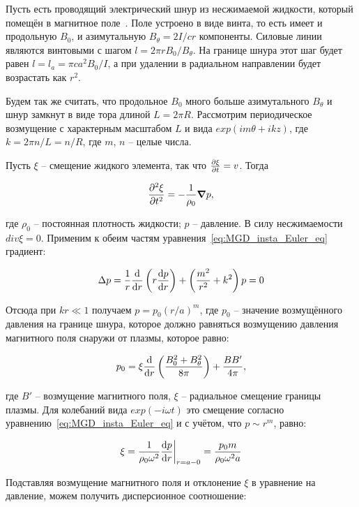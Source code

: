 \documentclass[10pt, a4paper]{article}
\begin{document}
Пусть есть проводящий электрический шнур из несжимаемой жидкости, который помещён в магнитное поле~\cite{kadomtsev}. Поле устроено в виде винта, то есть имеет и продольную $B_0$, и азимутальную $B_\theta = 2I/cr$ компоненты. Силовые линии являются винтовыми с шагом $l=2 \pi rB_0/B_\theta$. На границе шнура этот шаг будет равен $l=l_a=\pi ca^2B_0/I$, а при удалении в радиальном направлении будет возрастать как $r^2$.

Будем так же считать, что продольное $B_0$ много больше азимутального $B_\theta$ и шнур замкнут в виде тора длиной $L=2\pi R$. Рассмотрим периодическое возмущение с характерным масштабом $L$ и вида $exp(im \theta + ikz)$, где $k=2 \pi n/L=n/R$, где $m$, $n$ -- целые числа.

Пусть $\xi$ -- смещение жидкого элемента, так что $\pdv{\xi}{t}=v$. Тогда

\begin{equation*} \label{eq:MGD_insta_Euler_eq}
\pdv[2]{\xi}{t}= -\frac{1}{\rho_0} \grad p,
\end{equation*}

где $\rho_0$ -- постоянная плотность жидкости; $p$ -- давление. В силу несжимаемости $div \xi =0$. Применим к обеим частям уравнения~\ref{eq:MGD_insta_Euler_eq} градиент:

\begin{equation*}
\Delta p = \frac{1}{r}\dv{}{r}\left(r\dv{p}{r}\right) + \left(\frac{m^2}{r^2}+k^2\right) p=0
\end{equation*}

Отсюда при $kr \ll 1$ получаем $p=p_0 (r/a)^{m}$, где $p_0$ -- значение возмущённого давления на границе шнура, которое должно равняться возмущению давления магнитного поля снаружи от плазмы, которое равно:

\begin{equation*}
p_0 = \xi \dv{}{r}\left(\frac{B^2_0+B_\theta^2}{8 \pi}\right) + \frac{B B'}{4\pi},
\end{equation*}

где $B'$ -- возмущение магнитного поля, $\xi$ -- радиальное смещение границы плазмы. Для колебаний вида $exp(-i \omega t)$ это смещение согласно уравнению~\ref{eq:MGD_insta_Euler_eq} и с учётом, что $p \sim r^{m}$, равно:

\begin{equation*}
\xi = \frac{1}{\rho_0 \omega^2}\dv{p}{r}\bigg|_{r=a-0}= \frac{p_0 m}{\rho_0 \omega^2 a}
\end{equation*}

Подставляя возмущение магнитного поля и отклонение $\xi$ в уравнение на давление, можем получить дисперсионное соотношение:
\end{document}
